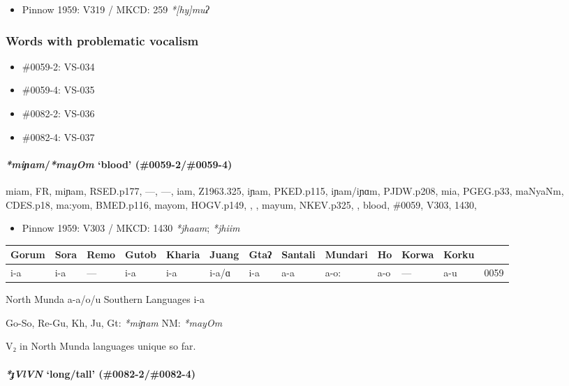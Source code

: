 \documentclass[a4paper,]{article}
\providecommand{\tightlist}{%
  \setlength{\itemsep}{0pt}\setlength{\parskip}{0pt}}
\let\oldparagraph\paragraph
\renewcommand{\paragraph}[1]{\oldparagraph{#1}\mbox{}}
\begin{document}
\begin{itemize}
\tightlist
\item
  Pinnow 1959: V319 / MKCD: 259 \emph{*{[}hy{]}muʔ}
\end{itemize}

\subsubsection{Words with problematic
vocalism}\label{words-with-problematic-vocalism}

\begin{itemize}
\tightlist
\item
  \#0059-2: VS-034
\item
  \#0059-4: VS-035
\item
  \#0082-2: VS-036
\item
  \#0082-4: VS-037
\end{itemize}

\paragraph{\texorpdfstring{\emph{*miɲam}/\emph{*mayOm} `blood'
(\#0059-2/\#0059-4)}{*miɲam/*mayOm blood (\#0059-2/\#0059-4)}}\label{miux272ammayom-blood-0059-20059-4}

miam, FR, miɲam, RSED.p177, ---, ---, iam, Z1963.325, iɲam, PKED.p115,
iɲam/iɲɑm, PJDW.p208, mia, PGEG.p33, maNyaNm, CDES.p18, ma:yom,
BMED.p116, mayom, HOGV.p149, , , mayum, NKEV.p325, , blood, \#0059,
V303, 1430,

\begin{itemize}
\tightlist
\item
  Pinnow 1959: V303 / MKCD: 1430 \emph{*jhaam}; \emph{*jhiim}
\end{itemize}

\begin{longtable}[]{@{}lllllllllllll@{}}
\toprule
Gorum & Sora & Remo & Gutob & Kharia & Juang & Gtaʔ & Santali & Mundari
& Ho & Korwa & Korku &\tabularnewline
\midrule
\endhead
i-a & i-a & --- & i-a & i-a & i-a/ɑ & i-a & a-a & a-o: & a-o & --- & a-u
& 0059\tabularnewline
\bottomrule
\end{longtable}

North Munda a-a/o/u Southern Languages i-a

Go-So, Re-Gu, Kh, Ju, Gt: \emph{*miɲam} NM: \emph{*mayOm}

V₂ in North Munda languages unique so far.

\paragraph{\texorpdfstring{\emph{*ɟVlVN} `long/tall'
(\#0082-2/\#0082-4)}{*ɟVlVN long/tall (\#0082-2/\#0082-4)}}\label{ux25fvlvn-longtall-0082-20082-4}
\end{document}

